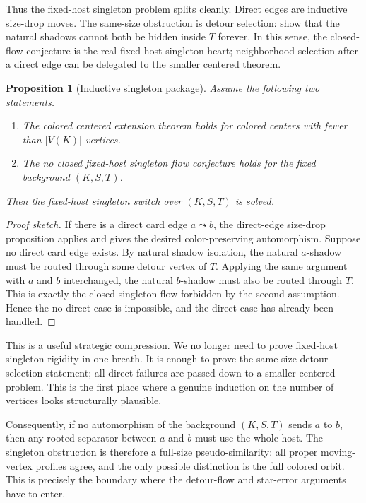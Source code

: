 \documentclass[11pt]{article}
\newtheorem{proposition}{Proposition}
\begin{document}
Thus the fixed-host singleton problem splits cleanly.  Direct edges are
inductive size-drop moves.  The same-size obstruction is detour selection:
show that the natural shadows cannot both be hidden inside \(T\) forever.  In
this sense, the closed-flow conjecture is the real fixed-host singleton
heart; neighborhood selection after a direct edge can be delegated to the
smaller centered theorem.

\begin{proposition}[Inductive singleton package]
Assume the following two statements.

\begin{enumerate}[leftmargin=2em]
  \item The colored centered extension theorem holds for colored centers with
  fewer than \(|V(K)|\) vertices.

  \item The no closed fixed-host singleton flow conjecture holds for the
  fixed background \((K,S,T)\).
\end{enumerate}

Then the fixed-host singleton switch over \((K,S,T)\) is solved.
\end{proposition}

\begin{proof}[Proof sketch]
If there is a direct card edge \(a\leadsto b\), the direct-edge size-drop
proposition applies and gives the desired color-preserving automorphism.
Suppose no direct card edge exists.  By natural shadow isolation, the natural
\(a\)-shadow must be routed through some detour vertex of \(T\).  Applying the
same argument with \(a\) and \(b\) interchanged, the natural \(b\)-shadow must
also be routed through \(T\).  This is exactly the closed singleton flow
forbidden by the second assumption.  Hence the no-direct case is impossible,
and the direct case has already been handled.
\end{proof}

This is a useful strategic compression.  We no longer need to prove
fixed-host singleton rigidity in one breath.  It is enough to prove the
same-size detour-selection statement; all direct failures are passed down to a
smaller centered problem.  This is the first place where a genuine induction
on the number of vertices looks structurally plausible.

Consequently, if no automorphism of the background \((K,S,T)\) sends \(a\) to
\(b\), then any rooted separator between \(a\) and \(b\) must use the whole
host.  The singleton obstruction is therefore a full-size pseudo-similarity:
all proper moving-vertex profiles agree, and the only possible distinction is
the full colored orbit.  This is precisely the boundary where the detour-flow
and star-error arguments have to enter.
\end{document}
